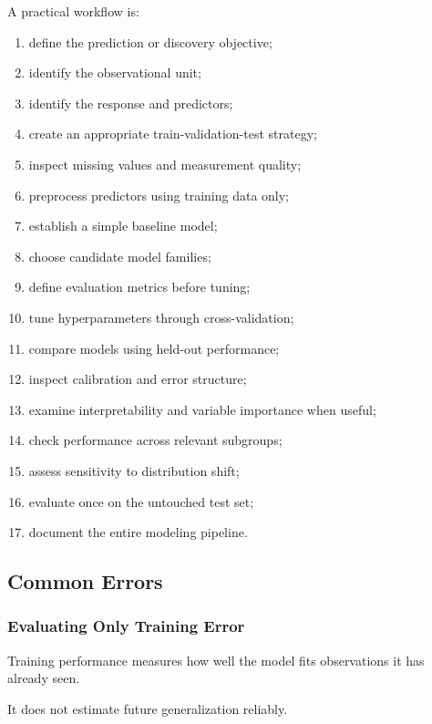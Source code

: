 A practical workflow is:

\begin{enumerate}
    \item define the prediction or discovery objective;
    \item identify the observational unit;
    \item identify the response and predictors;
    \item create an appropriate train-validation-test strategy;
    \item inspect missing values and measurement quality;
    \item preprocess predictors using training data only;
    \item establish a simple baseline model;
    \item choose candidate model families;
    \item define evaluation metrics before tuning;
    \item tune hyperparameters through cross-validation;
    \item compare models using held-out performance;
    \item inspect calibration and error structure;
    \item examine interpretability and variable importance when useful;
    \item check performance across relevant subgroups;
    \item assess sensitivity to distribution shift;
    \item evaluate once on the untouched test set;
    \item document the entire modeling pipeline.
\end{enumerate}

\subsection{Common Errors}
\label{subsec:statistical-learning-common-errors}

\subsubsection{Evaluating Only Training Error}

Training performance measures how well the model fits observations it has
already seen.

It does not estimate future generalization reliably.

